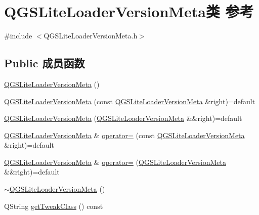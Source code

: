 \hypertarget{class_q_g_s_lite_loader_version_meta}{}\section{Q\+G\+S\+Lite\+Loader\+Version\+Meta类 参考}
\label{class_q_g_s_lite_loader_version_meta}


{\ttfamily \#include $<$Q\+G\+S\+Lite\+Loader\+Version\+Meta.\+h$>$}

\subsection*{Public 成员函数}
\begin{DoxyCompactItemize}
\item 
\mbox{\hyperlink{class_q_g_s_lite_loader_version_meta_a75b5cec5745bb0d7bf6df272fda53ed1}{Q\+G\+S\+Lite\+Loader\+Version\+Meta}} ()
\item 
\mbox{\hyperlink{class_q_g_s_lite_loader_version_meta_adf6c707c1ac746133fd7d07562433291}{Q\+G\+S\+Lite\+Loader\+Version\+Meta}} (const \mbox{\hyperlink{class_q_g_s_lite_loader_version_meta}{Q\+G\+S\+Lite\+Loader\+Version\+Meta}} \&right)=default
\item 
\mbox{\hyperlink{class_q_g_s_lite_loader_version_meta_af3b7acc660aa73955d0ea74180838a8b}{Q\+G\+S\+Lite\+Loader\+Version\+Meta}} (\mbox{\hyperlink{class_q_g_s_lite_loader_version_meta}{Q\+G\+S\+Lite\+Loader\+Version\+Meta}} \&\&right)=default
\item 
\mbox{\hyperlink{class_q_g_s_lite_loader_version_meta}{Q\+G\+S\+Lite\+Loader\+Version\+Meta}} \& \mbox{\hyperlink{class_q_g_s_lite_loader_version_meta_a9eedfe01847c1d7bada75ca2b12e611d}{operator=}} (const \mbox{\hyperlink{class_q_g_s_lite_loader_version_meta}{Q\+G\+S\+Lite\+Loader\+Version\+Meta}} \&right)=default
\item 
\mbox{\hyperlink{class_q_g_s_lite_loader_version_meta}{Q\+G\+S\+Lite\+Loader\+Version\+Meta}} \& \mbox{\hyperlink{class_q_g_s_lite_loader_version_meta_a7be5d2e5fd1954890a34354dac770a32}{operator=}} (\mbox{\hyperlink{class_q_g_s_lite_loader_version_meta}{Q\+G\+S\+Lite\+Loader\+Version\+Meta}} \&\&right)=default
\item 
\mbox{\hyperlink{class_q_g_s_lite_loader_version_meta_a123592441c11c2a5adee4a2ecd44017d}{$\sim$\+Q\+G\+S\+Lite\+Loader\+Version\+Meta}} ()
\item 
Q\+String \mbox{\hyperlink{class_q_g_s_lite_loader_version_meta_ae3865f4008cf4abc94c74f87731f4391}{get\+Tweak\+Class}} () const

\end{DoxyCompactItemize}
